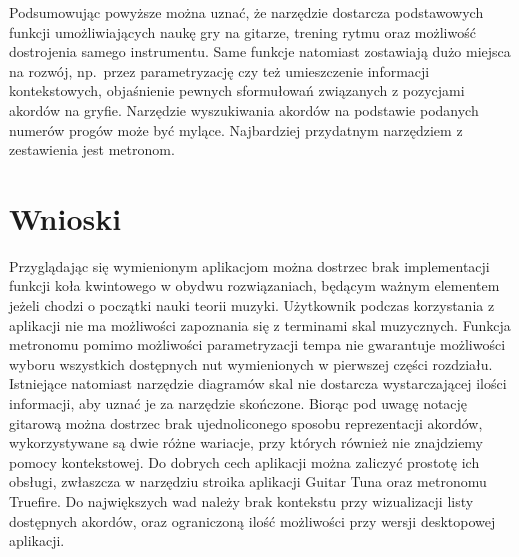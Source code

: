Podsumowując powyższe można uznać, że narzędzie dostarcza podstawowych funkcji umożliwiających naukę gry na gitarze, trening rytmu oraz możliwość dostrojenia samego instrumentu. Same funkcje natomiast zostawiają dużo miejsca na rozwój, np.\ przez parametryzację czy też umieszczenie informacji kontekstowych, objaśnienie pewnych sformułowań związanych z pozycjami akordów na gryfie. Narzędzie wyszukiwania akordów na podstawie podanych numerów progów może być mylące. Najbardziej przydatnym narzędziem z zestawienia jest metronom. 

\section{Wnioski}

Przyglądając się wymienionym aplikacjom można dostrzec brak implementacji funkcji koła kwintowego w obydwu rozwiązaniach, będącym ważnym elementem jeżeli chodzi o początki nauki teorii muzyki. Użytkownik podczas korzystania z aplikacji nie ma możliwości zapoznania się z terminami skal muzycznych. Funkcja metronomu pomimo możliwości parametryzacji tempa nie gwarantuje możliwości wyboru wszystkich dostępnych nut wymienionych w pierwszej części rozdziału. Istniejące natomiast narzędzie diagramów skal nie dostarcza wystarczającej ilości informacji, aby uznać je za narzędzie skończone. Biorąc pod uwagę notację gitarową można dostrzec brak ujednoliconego sposobu reprezentacji akordów, wykorzystywane są dwie różne wariacje, przy których również nie znajdziemy pomocy kontekstowej. Do dobrych cech aplikacji można zaliczyć prostotę ich obsługi, zwłaszcza w narzędziu stroika aplikacji Guitar Tuna oraz metronomu Truefire. Do największych wad należy brak kontekstu przy wizualizacji listy dostępnych akordów, oraz ograniczoną ilość możliwości przy wersji desktopowej aplikacji.


